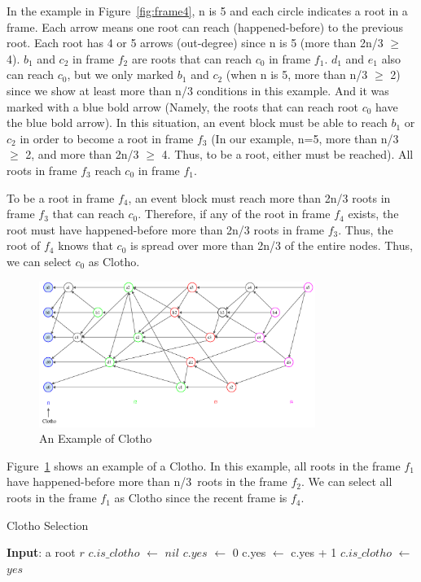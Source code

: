 \documentclass{article}
\begin{document}
\newpage
In the example in Figure~\ref{fig:frame4}, n is 5 and each circle indicates a root in a frame. Each arrow means one root can reach (happened-before) to the previous root. Each root has 4 or 5 arrows (out-degree) since n is 5 (more than 2n/3 $\geq$ 4). $b_1$ and $c_2$ in frame $f_2$ are roots that can reach $c_0$ in frame $f_1$. $d_1$ and $e_1$ also can reach $c_0$, but we only marked $b_1$ and $c_2$ (when n is 5, more than n/3 $\geq$ 2) since we show at least more than n/3 conditions in this example. And it was marked with a blue bold arrow (Namely, the roots that can reach root $c_0$ have the blue bold arrow). In this situation, an event block must be able to reach $b_1$ or $c_2$ in order to become a root in frame $f_3$ (In our example, n=5, more than n/3 $\geq$ 2, and more than 2n/3 $\geq$ 4. Thus, to be a root, either must be reached). All roots in frame $f_3$ reach $c_0$ in frame $f_1$.  

To be a root in frame $f_4$, an event block must reach more than 2n/3 roots in frame $f_3$ that can reach $c_0$. Therefore, if any of the root in frame $f_4$ exists, the root must have happened-before more than 2n/3 roots in frame $f_3$. Thus, the root of $f_4$ knows that $c_0$ is spread over more than 2n/3 of the entire nodes. Thus, we can select $c_0$ as Clotho. 


\begin{figure}[h]\centering  
	\includegraphics[width=0.8\textwidth]{Clotho_fig1.pdf}
	\caption{An Example of Clotho}
	\label{fig:Clotho}
\end{figure}

\newpage
Figure~\ref{fig:Clotho} shows an example of a Clotho. In this example, all roots in the frame $f_1$ have happened-before more than n/3 roots in the frame $f_2$. We can select all roots in the frame $f_1$ as Clotho since the recent frame is $f_4$. 

\begin{algorithm}
\caption{Clotho Selection}\label{al:acs}
\begin{algorithmic}[1]
	\State \textbf{Input}: a root $r$
	\State$c.is\_clotho$ $\leftarrow$ $nil$ 
	\State$c.yes$ $\leftarrow$ 0
	\State c.yes $\leftarrow$ c.yes + 1
	\EndIf
	\EndFor
	\State $c.is\_clotho$ $\leftarrow$ $yes$
	\EndIf
	\EndFor
	\EndProcedure
\end{algorithmic}
\end{algorithm}
\end{document}
